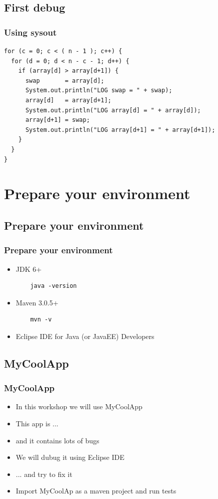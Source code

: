 \documentclass{beamer}
\begin{document}
\subsection{First debug}
\begin{frame}[fragile]
\frametitle{Using sysout}
\begin{lstlisting}
for (c = 0; c < ( n - 1 ); c++) {
  for (d = 0; d < n - c - 1; d++) {
    if (array[d] > array[d+1]) {
      swap       = array[d];
      System.out.println("LOG swap = " + swap);
      array[d]   = array[d+1];
      System.out.println("LOG array[d] = " + array[d]);
      array[d+1] = swap;
      System.out.println("LOG array[d+1] = " + array[d+1]);
    }
  }
}
\end{lstlisting}
\end{frame}

\section{Prepare your environment}

\subsection{Prepare your environment}
\begin{frame}[fragile]
\frametitle{Prepare your environment}
\begin{itemize}
\item JDK 6+
  \begin{lstlisting}
    java -version
  \end{lstlisting}
\item Maven 3.0.5+
  \begin{lstlisting}
    mvn -v
  \end{lstlisting}
\item Eclipse IDE for Java (or JavaEE) Developers
\end{itemize}
\end{frame}

\subsection{MyCoolApp}
\begin{frame}[fragile]
\frametitle{MyCoolApp}
\begin{itemize}
\item In this workshop we will use MyCoolApp
\item This app is ...
\item and it contains lots of bugs
\item We will dubug it using Eclipse IDE
\item ... and try to fix it
\item Import MyCoolAp as a maven project and run tests
\end{itemize}
\end{frame}
\end{document}
